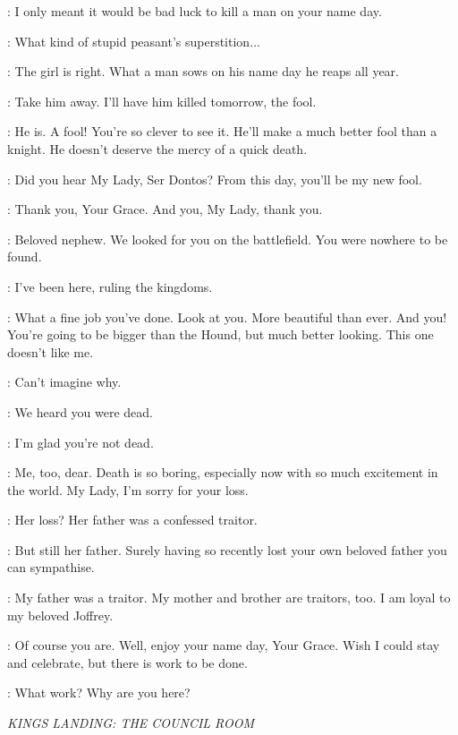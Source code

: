 \SANSA: I only meant it would be bad luck to kill a man on your name day.

\JOFFREY: What kind of stupid peasant's superstition$\ldots$

\HOUND: The girl is right. What a man sows on his name day he reaps all year.

\JOFFREY: Take him away. I'll have him killed tomorrow, the fool.

\SANSA: He is. A fool! You're so clever to see it. He'll make a much better fool than a knight. He doesn't deserve the mercy of a quick death.

\JOFFREY: Did you hear My Lady, Ser Dontos? From this day, you'll be my new fool.

\DONTOS: Thank you, Your Grace. And you, My Lady, thank you.


\TYRION: Beloved nephew. We looked for you on the battlefield. You were nowhere to be found.

\JOFFREY: I've been here, ruling the kingdoms.

\TYRION: What a fine job you've done.  Look at you. More beautiful than ever.  And you! You're going to be bigger than the Hound, but much better looking.  This one doesn't like me.

\BRONN: Can't imagine why.

\JOFFREY: We heard you were dead.

\MYRCELLA: I'm glad you're not dead.

\TYRION: Me, too, dear. Death is so boring, especially now with so much excitement in the world.  My Lady, I'm sorry for your loss.

\JOFFREY: Her loss? Her father was a confessed traitor.

\TYRION: But still her father. Surely having so recently lost your own beloved father you can sympathise.

\SANSA: My father was a traitor. My mother and brother are traitors, too. I am loyal to my beloved Joffrey.

\enlargethispage*{20pt}
\TYRION: Of course you are. Well, enjoy your name day, Your Grace. Wish I could stay and celebrate, but there is work to be done.

\JOFFREY: What work? Why are you here?


\scene

\textit{KINGS LANDING: THE COUNCIL ROOM}

